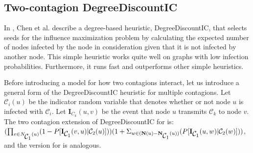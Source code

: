 \documentclass[11pt]{article}
\begin{document}
    



\subsection{Two-contagion DegreeDiscountIC}
In \cite{DegreeDiscount}, Chen et al. describe a degree-based heuristic, DegreeDiscountIC, that selects seeds for the influence maximization problem by calculating the expected number of nodes infected by the node in consideration given that it is not infected by another node. This simple heuristic works quite well on graphs with low infection probabilities. Furthermore, it runs fast and outperforms other simple heuristics.

Before introducing a model for how two contagions interact, let us introduce a general form of the DegreeDiscountIC heuristic for multiple contagions. Let $\mathcal{C}_{i}(u)$ be the indicator random variable that denotes whether or not node $u$ is infected with $\mathcal{C}_{i}$. Let $\mathbf{I}_{C_{k}}(u,v)$ be the event that node $u$ transmits $\mathcal{C}_k$ to node $v$. The two contagion extension of DegreeDiscountIC for \cone{} is: $(\prod_{v\in \mathbf{}{N}_{\mbox{$\mathcal{C}_1$}{}}(u)}(1-P[\mathbf{I}_{\mbox{$\mathcal{C}_1$}}(v,u)|\mbox{$\mathcal{C}_2$}(u) ]))(1+\Sigma_{w \in  (\mathbf{N}(u)-  \mathbf{N}_{\mbox{$\mathcal{C}_1$}{}}(u))}(P[\mathbf{I}_{\mbox{$\mathcal{C}_1$}}(u,w)|\mbox{$\mathcal{C}_2$}(w)]))$, and the version for \ctwo{} is analogous.
    
\end{document}
